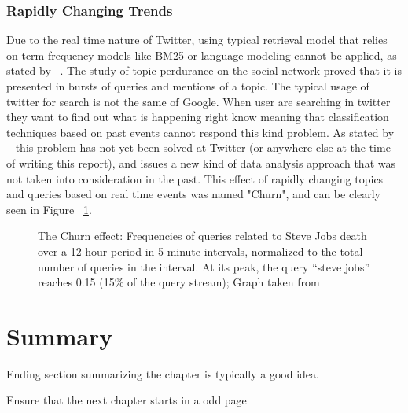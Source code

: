 \subsubsection{Rapidly Changing Trends} 
\label{ssub:real_time_}
Due to the real time nature of Twitter, using typical retrieval model that relies on term frequency models like BM25 or language modeling cannot be applied, as stated by ~\citet{Lin2012}. The study of topic perdurance on the social network proved that it is presented in bursts of queries and mentions of a topic. The typical usage of twitter for search is not the same of Google. When user are searching in twitter they want to find out what is happening right know meaning that classification techniques based on past events cannot respond this kind problem. As stated by ~\citet{Lin2012} this problem has not yet been solved at Twitter (or anywhere else at the time of writing this report), and issues a new kind of data analysis approach that was not taken into consideration in the past. 
This effect of rapidly changing topics and queries based on real time events was named "Churn", and can be clearly seen in Figure ~\ref{fig:churn}.

  \begin{figure}[tb]
    \begin{center}
    \noindent{}
    \end{center}
    \caption{The Churn effect: Frequencies of queries related to Steve Jobs death over a 12 hour period in 5-minute intervals, normalized to the total number of queries in the interval. At its peak, the query “steve jobs” reaches 0.15 (15\% of the query stream); Graph taken from ~\cite{Lin2012}}
    \label{fig:churn}
  \end{figure}


\section{Summary}
Ending section summarizing the chapter is typically a good idea.

Ensure that the next chapter starts in a odd page
\cleardoublepage 
